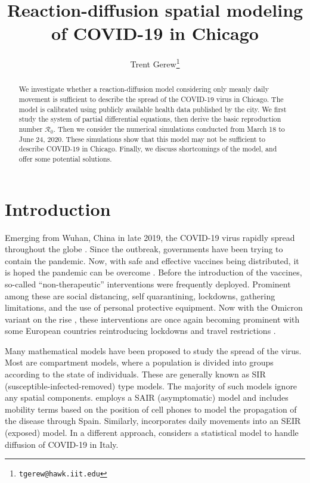 \documentclass[11pt]{article}
\title{Reaction-diffusion spatial modeling of COVID-19 in Chicago}
\author{Trent Gerew\thanks{\texttt{tgerew@hawk.iit.edu}}}
\institute{Department of Applied Mathematics, Illinois Institute of Technology, Chicago, Illinois}
\newcommand{\Ro}{\mathcal{R}_0}
\begin{document}
\maketitle

\begin{abstract}
	We investigate whether a reaction-diffusion model considering only meanly daily movement is sufficient to describe the spread of the COVID-19 virus in Chicago.
	The model is calibrated using publicly available health data published by the city.
	We first study the system of partial differential equations, then derive the basic reproduction number $\Ro$.
	Then we consider the numerical simulations conducted from March 18 to June 24, 2020.
	These simulations show that this model may not be sufficient to describe COVID-19 in Chicago.
	Finally, we discuss shortcomings of the model, and offer some potential solutions.
\end{abstract}

\section{Introduction}
	Emerging from Wuhan, China in late 2019, the COVID-19 virus rapidly spread throughout the globe \cite{covid-name}.
	Since the outbreak, governments have been trying to contain the pandemic.
	Now, with safe and effective vaccines being distributed, it is hoped the pandemic can be overcome \cite{vaccine}.
	Before the introduction of the vaccines, so-called ``non-therapeutic'' interventions \cite{interventions1} were frequently deployed.
	Prominent among these are social distancing, self quarantining, lockdowns, gathering limitations, and the use of personal protective equipment.
	Now with the Omicron variant on the rise \cite{omicron}, these interventions are once again becoming prominent with some European countries reintroducing lockdowns and travel restrictions \cite{lockdowns}.
	
	Many mathematical models have been proposed to study the spread of the virus.
	Most are compartment models, where a population is divided into groups according to the state of individuals.
	These are generally known as SIR (susceptible-infected-removed) type models.
	The majority of such models ignore any spatial components.
	\cite{s+t+spain} employs a SAIR (asymptomatic) model and includes mobility terms based on the position of cell phones to model the propagation of the disease through Spain.
	Similarly, \cite{Danon2020.02.12.20022566} incorporates daily movements into an SEIR (exposed) model.
	In a different approach, \cite{giuliani2020modelling} considers a statistical model to handle diffusion of COVID-19 in Italy.
	
\end{document}
